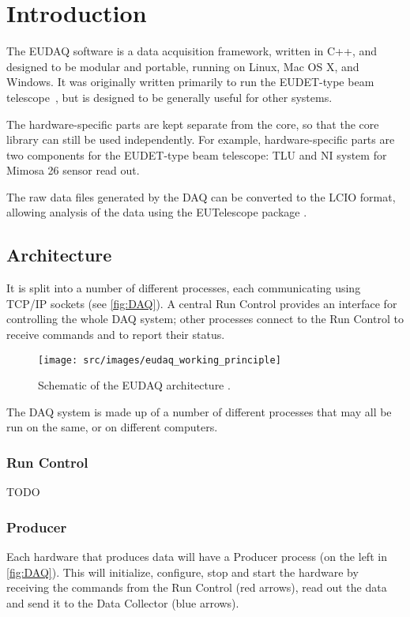 \section{Introduction}
The EUDAQ software is a data acquisition framework, written in C++,
and designed to be modular and portable, running on Linux, Mac OS X, and Windows.
It was originally written primarily to run the EUDET-type beam telescope~\cite{Roloff:2009zza,Jansen:2016},
but is designed to be generally useful for other systems.

The hardware-specific parts are kept separate from the core,
so that the core library can still be used independently.
For example, hardware-specific parts are two components for the EUDET-type beam telescope: \gls{TLU} and \gls{NI} system for Mimosa 26 sensor read out.

The raw data files generated by the DAQ can be converted to the \gls{LCIO} format,
allowing analysis of the data using the EUTelescope package \cite{eutel2008}.

\subsection{Architecture}
It is split into a number of different processes,
each communicating using TCP/IP sockets (see \autoref{fig:DAQ}).
A central Run Control provides an interface for controlling the whole DAQ system;
other processes connect to the Run Control to receive commands and to report their status.

\begin{figure}[htb]
  \begin{center}
    \texttt{[image: src/images/eudaq\_working\_principle]}
    \caption{Schematic of the EUDAQ architecture \cite{Spannagel:2016}.}
    \label{fig:DAQ}
  \end{center}
\end{figure}


The DAQ system is made up of a number of different processes that may all be run on the same,
or on different computers. 

\subsubsection{Run Control}
TODO\\


\subsubsection{Producer}
Each hardware that produces data will have a Producer process (on the left in \autoref{fig:DAQ}).
This will initialize, configure, stop and start the hardware by receiving the commands from the Run Control (red arrows), read out the data and send it to the Data Collector (blue arrows).

